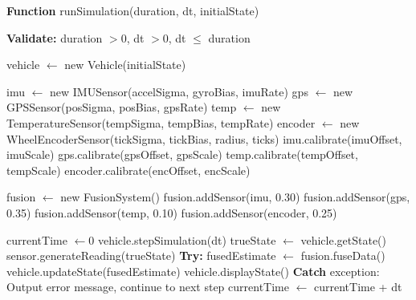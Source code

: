 \documentclass[a4paper,11pt]{article}
\begin{document}
\begin{algorithm}[H]
\caption{Main Simulation Loop   Full Pipeline}
\begin{algorithmic}[1]

\State \textbf{Function} runSimulation(duration, dt, initialState)

\vspace{0.15cm}
\State {}
\State \textbf{Validate:} duration $> 0$, dt $> 0$, dt $\leq$ duration

\vspace{0.15cm}
\State {}
\State vehicle $\leftarrow$ new Vehicle(initialState)

\vspace{0.15cm}
\State {}
\State imu $\leftarrow$ new IMUSensor(accelSigma, gyroBias, imuRate)
\State gps $\leftarrow$ new GPSSensor(posSigma, posBias, gpsRate)
\State temp $\leftarrow$ new TemperatureSensor(tempSigma, tempBias, tempRate)
\State encoder $\leftarrow$ new WheelEncoderSensor(tickSigma, tickBias, radius, ticks)
\State imu.calibrate(imuOffset, imuScale)
\State gps.calibrate(gpsOffset, gpsScale)
\State temp.calibrate(tempOffset, tempScale)
\State encoder.calibrate(encOffset, encScale)

\vspace{0.15cm}
\State {}
\State fusion $\leftarrow$ new FusionSystem()
\State fusion.addSensor(imu, 0.30)
\State fusion.addSensor(gps, 0.35)
\State fusion.addSensor(temp, 0.10)
\State fusion.addSensor(encoder, 0.25)

\vspace{0.15cm}
\State {}
\State currentTime $\leftarrow 0$
\State \hspace{0.5cm} vehicle.stepSimulation(dt) 
\State \hspace{0.5cm} trueState $\leftarrow$ vehicle.getState()
\State \hspace{0.5cm} 
\State \hspace{1cm} 
\State \hspace{1.5cm} sensor.generateReading(trueState)
\State \hspace{1cm} \EndIf
\State \hspace{0.5cm} \EndFor
\State \hspace{0.5cm} \textbf{Try:}
\State \hspace{1cm} fusedEstimate $\leftarrow$ fusion.fuseData()
\State \hspace{1cm} vehicle.updateState(fusedEstimate)
\State \hspace{1cm} vehicle.displayState()
\State \hspace{0.5cm} \textbf{Catch} exception:
\State \hspace{1cm} Output error message, continue to next step
\State \hspace{0.5cm} currentTime $\leftarrow$ currentTime + dt
\EndWhile


\end{algorithmic}
\end{algorithm}
\end{document}
